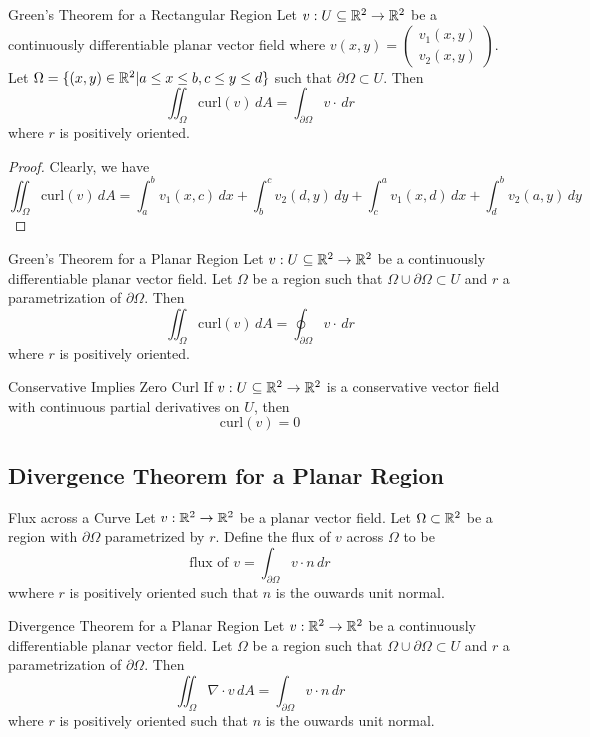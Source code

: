 \documentclass[a4paper]{article}
\begin{document}
\begin{thm}{Green's Theorem for a Rectangular Region}{} Let $v:U\subseteq\mathbb{R}^2\to\mathbb{R}^2$ be a continuously differentiable planar vector field where $v(x,y)=\begin{pmatrix}v_1(x,y)\\v_2(x,y)\end{pmatrix}$. Let $\Omega=\{(x,y)\in\mathbb{R}^2|a\leq x\leq b,c\leq y\leq d\}$ such that $\partial\Omega\subset U$. Then $$\iint_\Omega\text{curl}(v)\,dA=\int_{\partial\Omega}v\cdot\,dr$$ where $r$ is positively oriented. \tcbline
\begin{proof}
Clearly, we have $$\iint_\Omega\text{curl}(v)\,dA=\int_a^bv_1(x,c)\,dx+\int_b^cv_2(d,y)\,dy+\int_c^av_1(x,d)\,dx+\int_d^bv_2(a,y)\,dy$$
\end{proof}
\end{thm}

\begin{thm}{Green's Theorem for a Planar Region}{} Let $v:U\subseteq\mathbb{R}^2\to\mathbb{R}^2$ be a continuously differentiable planar vector field. Let $\Omega$ be a region such that $\Omega\cup\partial\Omega\subset U$ and $r$ a parametrization of $\partial\Omega$. Then $$\iint_\Omega\text{curl}(v)\,dA=\oint_{\partial\Omega}v\cdot\,dr$$ where $r$ is positively oriented. 
\end{thm}

\begin{thm}{Conservative Implies Zero Curl}{} If $v:U\subseteq\mathbb{R}^2\to\mathbb{R}^2$ is a conservative vector field with continuous partial derivatives on $U$, then $$\text{curl}(v)=0$$
\end{thm}

\subsection{Divergence Theorem for a Planar Region}
\begin{defn}{Flux across a Curve}{} Let $v:\mathbb{R}^2\to\mathbb{R}^2$ be a planar vector field. Let $\Omega\subset\mathbb{R}^2$ be a region with $\partial\Omega$ parametrized by $r$. Define the flux of $v$ across $\Omega$ to be $$\text{flux of }v=\int_{\partial\Omega}v\cdot n\,dr$$ wwhere $r$ is positively oriented such that $n$ is the ouwards unit normal. 
\end{defn}

\begin{thm}{Divergence Theorem for a Planar Region}{} Let $v:\mathbb{R}^2\to\mathbb{R}^2$ be a continuously differentiable planar vector field. Let $\Omega$ be a region such that $\Omega\cup\partial\Omega\subset U$ and $r$ a parametrization of $\partial\Omega$. Then $$\iint_{\Omega}\nabla\cdot v\,dA=\int_{\partial\Omega}v\cdot n\,dr$$ where $r$ is positively oriented such that $n$ is the ouwards unit normal. 
\end{thm}
\end{document}
